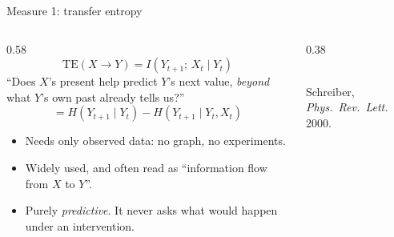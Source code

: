\documentclass[aspectratio=169,11pt,xcolor={table}]{beamer}
\newcommand{\Xt}{X_t}
\newcommand{\Yt}{Y_t}
\newcommand{\Yn}{Y_{t+1}}
\newcommand{\cmark}{{\color{sAqua}\ding{51}}}
\newcommand{\xmark}{{\color{sOrange}\ding{55}}}
\newcommand{\aside}[1]{{\color{muted}\small #1}}
\begin{document}
\begin{frame}{Measure 1: transfer entropy}
  \begin{columns}[c]
    \begin{column}{0.58\textwidth}
      \[ \mathrm{TE}(X \to Y) = I(\Yn;\, \Xt \mid \Yt) \]
      ``Does $X$'s present help predict $Y$'s next value,
      \emph{beyond} what $Y$'s own past already tells us?''
      \medskip
      \[ = H(\Yn \mid \Yt) - H(\Yn \mid \Yt, \Xt) \]
      \vspace{-3mm}
      \begin{itemize}
        \item[\cmark] Needs only observed data: no graph, no experiments.
        \item[\cmark] Widely used, and often read as ``information flow from $X$ to $Y$''.
        \item[\xmark] Purely \emph{predictive}. It never asks what would happen under an intervention.
      \end{itemize}
    \end{column}
    \begin{column}{0.38\textwidth}
      \centering
      \\[3mm]
      \aside{Schreiber, \emph{Phys.\ Rev.\ Lett.} 2000.}
    \end{column}
  \end{columns}
\end{frame}
\end{document}
